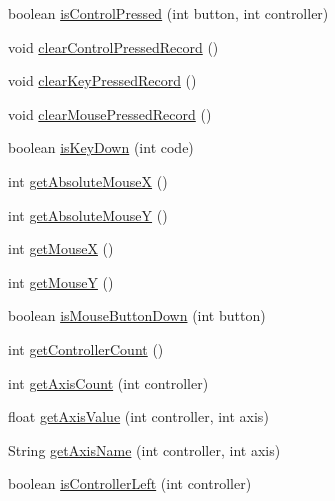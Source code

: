 \begin{DoxyCompactItemize}
boolean \mbox{\hyperlink{classorg_1_1newdawn_1_1slick_1_1_input_a0928a2783c676068dc034abbedfc6e77}{is\+Control\+Pressed}} (int button, int controller)
\item 
void \mbox{\hyperlink{classorg_1_1newdawn_1_1slick_1_1_input_af2cfc367b630baff82ee280cbc394244}{clear\+Control\+Pressed\+Record}} ()
\item 
void \mbox{\hyperlink{classorg_1_1newdawn_1_1slick_1_1_input_a0c1b796b24304c122ad233e9d70bdc73}{clear\+Key\+Pressed\+Record}} ()
\item 
void \mbox{\hyperlink{classorg_1_1newdawn_1_1slick_1_1_input_ac93fc5f763ff9031b095ecdaa118c6c3}{clear\+Mouse\+Pressed\+Record}} ()
\item 
boolean \mbox{\hyperlink{classorg_1_1newdawn_1_1slick_1_1_input_a2b904c85a112a9c531457c465f366ca8}{is\+Key\+Down}} (int code)
\item 
int \mbox{\hyperlink{classorg_1_1newdawn_1_1slick_1_1_input_a49d4962b7e03e34a137458c440fbf6b0}{get\+Absolute\+MouseX}} ()
\item 
int \mbox{\hyperlink{classorg_1_1newdawn_1_1slick_1_1_input_a379e07a12261cad357a75537d576e812}{get\+Absolute\+MouseY}} ()
\item 
int \mbox{\hyperlink{classorg_1_1newdawn_1_1slick_1_1_input_a59e2e96e215f9b8510ca42afec448c5e}{get\+MouseX}} ()
\item 
int \mbox{\hyperlink{classorg_1_1newdawn_1_1slick_1_1_input_abf405c2d30fa7ede5a8d8619c6737a76}{get\+MouseY}} ()
\item 
boolean \mbox{\hyperlink{classorg_1_1newdawn_1_1slick_1_1_input_aa563da1219078da62ff43ba88edbbb44}{is\+Mouse\+Button\+Down}} (int button)
\item 
int \mbox{\hyperlink{classorg_1_1newdawn_1_1slick_1_1_input_a4a81c87f7d16d49471106d7fbaa0989d}{get\+Controller\+Count}} ()
\item 
int \mbox{\hyperlink{classorg_1_1newdawn_1_1slick_1_1_input_a9c3dde96ab6a064b02e7eb24fe29cc4a}{get\+Axis\+Count}} (int controller)
\item 
float \mbox{\hyperlink{classorg_1_1newdawn_1_1slick_1_1_input_ad9bfc0d7d50ac52a8e6f0cca6a8e470b}{get\+Axis\+Value}} (int controller, int axis)
\item 
String \mbox{\hyperlink{classorg_1_1newdawn_1_1slick_1_1_input_a3840d085b002b57fa88c9fe6268523e9}{get\+Axis\+Name}} (int controller, int axis)
\item 
boolean \mbox{\hyperlink{classorg_1_1newdawn_1_1slick_1_1_input_a872615473ab4b93e0baceccb68d62787}{is\+Controller\+Left}} (int controller)

\end{DoxyCompactItemize}
